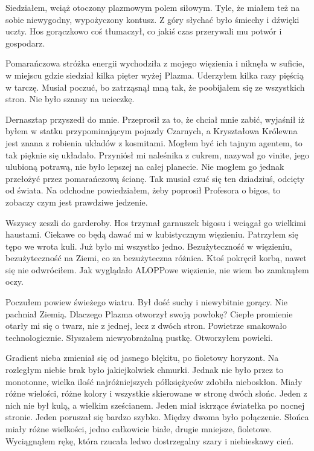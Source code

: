 Siedziałem, wciąż otoczony plazmowym polem siłowym. Tyle, że miałem też na sobie niewygodny, wypożyczony kontusz.
Z góry słychać było śmiechy i dźwięki uczty.
Hos gorączkowo coś tłumaczył, co jakiś czas przerywali mu potwór i gospodarz.

Pomarańczowa stróżka energii wychodziła z mojego więzienia i niknęła w suficie, w miejscu gdzie siedział kilka pięter wyżej Plazma.
Uderzyłem kilka razy pięścią w tarczę.
Musiał poczuć, bo zatrząsnął mną tak, że poobijałem się ze wszystkich stron.
Nie było szansy na ucieczkę.

Dernasztap przyszedł do mnie. Przeprosił za to, że chciał mnie zabić, wyjaśnił iż byłem w statku przypominającym pojazdy Czarnych, a
Kryształowa Królewna jest znana z robienia układów z kosmitami. Mogłem być ich tajnym agentem, to tak pięknie się układało.
Przyniósł mi naleśnika z cukrem, nazywał go vinite, jego ulubioną potrawą, nie było lepszej na całej planecie. 
Nie mogłem go jednak przełożyć przez pomarańczową ścianę. Tak musiał czuć się ten dziadziuś, odcięty od świata.
Na odchodne powiedziałem, żeby poprosił Profesora o bigos, to zobaczy czym jest prawdziwe jedzenie. 

Wszyscy zeszli do garderoby. Hos trzymał garnuszek bigosu i wciągał go wielkimi haustami. Ciekawe co będą dawać mi w kubistycznym więzieniu.
Patrzyłem się tępo we wrota kuli. Już było mi wszystko jedno. Bezużyteczność w więzieniu, bezużyteczność na Ziemi, co za bezużyteczna różnica.
Ktoś pokręcił korbą, nawet się nie odwróciłem.
Jak wyglądało ALOPPowe więzienie, nie wiem bo zamknąłem oczy.

Poczułem powiew świeżego wiatru.
Był dość suchy i niewybitnie gorący. Nie pachniał Ziemią.
Dlaczego Plazma otworzył swoją powłokę?
Ciepłe promienie otarły mi się o twarz, nie z jednej, lecz z dwóch stron.
Powietrze smakowało technologicznie.
Słyszałem niewyobrażalną pustkę.
Otworzyłem powieki.

Gradient nieba zmieniał się od jasnego błękitu, po fioletowy horyzont.
Na rozległym niebie brak było jakiejkolwiek chmurki.
Jednak nie było przez to monotonne, wielka ilość najróżniejszych półksiężyców zdobiła nieboskłon.
Miały różne wielości, różne kolory i wszystkie skierowane w stronę dwóch słońc.
Jeden z nich nie był kulą, a wielkim sześcianem.
Jeden miał iskrzące światełka po nocnej stronie.
Jeden poruszał się bardzo szybko.
Między dwoma było połączenie.
Słońca miały różne wielkości, jedno całkowicie białe, drugie mniejsze, fioletowe.
Wyciągnąłem rękę, która rzucała ledwo dostrzegalny szary i niebieskawy cień.

